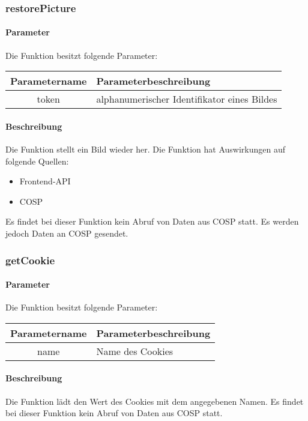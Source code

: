 \subsubsection{restorePicture}
\paragraph{Parameter} Die Funktion besitzt folgende Parameter:
\begin{table}[H]
	\begin{tabular}{|c|p{11cm}|}
		\hline
		\textbf{Parametername} & \textbf{Parameterbeschreibung} \\ \hline
		token & alphanumerischer Identifikator eines Bildes \\ \hline
	\end{tabular}
\end{table}
\paragraph{Beschreibung} Die Funktion stellt ein Bild wieder her. Die Funktion hat Auswirkungen auf folgende Quellen:
\begin{itemize}
	\item Frontend-API
	\item COSP
\end{itemize}
Es findet bei dieser Funktion kein Abruf von Daten aus {\glqq COSP\grqq} statt. Es werden jedoch Daten an {\glqq COSP\grqq} gesendet.

\subsubsection{getCookie}
\paragraph{Parameter} Die Funktion besitzt folgende Parameter:
\begin{table}[H]
	\begin{tabular}{|c|p{11cm}|}
		\hline
		\textbf{Parametername} & \textbf{Parameterbeschreibung} \\ \hline
		name & Name des Cookies \\ \hline
	\end{tabular}
\end{table}
\paragraph{Beschreibung} Die Funktion lädt den Wert des Cookies mit dem angegebenen Namen. Es findet bei dieser Funktion kein Abruf von Daten aus {\glqq COSP\grqq} statt.
